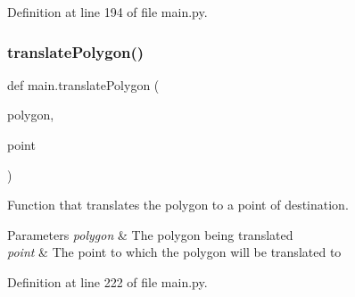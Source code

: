 Definition at line 194 of file main.\+py.

\mbox{\label{namespacemain_adeb2cd76f03836777dd43cb9bc133d89}} 
\subsubsection{\texorpdfstring{translate\+Polygon()}{translatePolygon()}}
{\footnotesize\ttfamily def main.\+translate\+Polygon (\begin{DoxyParamCaption}\item[{}]{polygon,  }\item[{}]{point }\end{DoxyParamCaption})}



Function that translates the polygon to a point of destination. 


\begin{DoxyParams}{Parameters}
{\em polygon} & The polygon being translated \\
\hline
{\em point} & The point to which the polygon will be translated to \\
\hline
\end{DoxyParams}


Definition at line 222 of file main.\+py.

